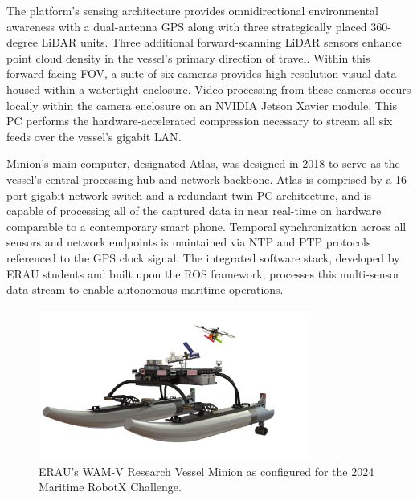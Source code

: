 \documentclass{erauthesis}
\begin{document}
The platform's sensing architecture provides omnidirectional environmental awareness with a dual-antenna \ac{GPS} along with three strategically placed 360-degree \ac{LiDAR} units.
Three additional forward-scanning \ac{LiDAR} sensors enhance point cloud density in the vessel's primary direction of travel. 
Within this forward-facing \ac{FOV}, a suite of six cameras provides high-resolution visual data housed within a watertight enclosure.
Video processing from these cameras occurs locally within the camera enclosure on an NVIDIA Jetson Xavier module.
This PC performs the hardware-accelerated compression necessary to stream all six feeds over the vessel's gigabit \ac{LAN}.

Minion's main computer, designated Atlas, was designed in 2018 to serve as the vessel's central processing hub and network backbone. 
Atlas is comprised by a 16-port gigabit network switch and a redundant twin-PC architecture, and is capable of processing all of the captured data in near real-time on hardware comparable to a contemporary smart phone.
Temporal synchronization across all sensors and network endpoints is maintained via \ac{NTP} and \ac{PTP} protocols referenced to the \ac{GPS} clock signal. The integrated software stack, developed by \ac{ERAU} students and built upon the \ac{ROS} framework, processes this multi-sensor data stream to enable autonomous maritime operations.


\begin{figure}[t]
\centering
\includegraphics[width=0.8\textwidth]{Images/Minion.png}
\caption{ERAU's \ac{WAM-V} Research Vessel Minion as configured for the 2024 Maritime RobotX Challenge.}
\label{fig:minion}
\end{figure}
\end{document}
